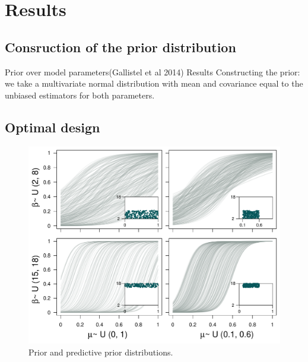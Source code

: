 \documentclass[preprint,review,12pt]{elsarticle}
\begin{document}
\section{Results}
\label{S:3}

\subsection{Consruction of the prior distribution}

Prior over model parameters(Gallistel et al 2014)
Results
Constructing the prior: we take a multivariate normal distribution with mean and covariance equal to the unbiased estimators for both parameters.


\subsection{Optimal design}

\begin{figure}
\includegraphics[width=\textwidth]{Prior_and_Predictive.pdf}
\caption{Prior and predictive prior distributions.}
\label{fig:ppd}
\end{figure}
\end{document}
